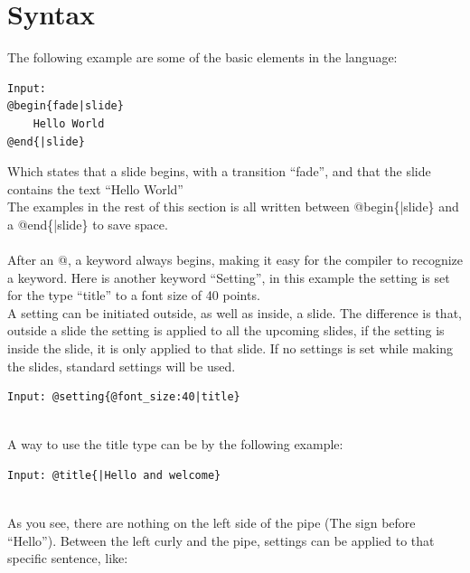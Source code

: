 \chapter{Syntax}
\label{SSyntax}
The following example are some of the basic elements in the language:
\begin{lstlisting}[frame=single]
Input:
@begin{fade|slide}
    Hello World
@end{|slide}
\end{lstlisting}


Which states that a slide begins, with a transition ``fade'', and that the slide contains the text ``Hello World'' \\
The examples in the rest of this section is all written between @begin\{|slide\} and a @end\{|slide\} to save space.
\\ \\
After an @, a keyword always begins, making it easy for the compiler to recognize a keyword.
Here is another keyword ``Setting'', in this example the setting is set for the type ``title'' to a font size of 40 points. \\
A setting can be initiated outside, as well as inside, a slide. The difference is that, outside a slide the setting is applied to all the upcoming slides, if the setting is inside the slide, it is only applied to that slide. If no settings is set while making the slides, standard settings will be used.

\begin{lstlisting}[frame=single]
Input: @setting{@font_size:40|title}
\end{lstlisting}

 \\

A way to use the title type can be by the following example:\\

\begin{lstlisting}[frame=single]
Input: @title{|Hello and welcome}
\end{lstlisting}

\\

As you see, there are nothing on the left side of the pipe (The sign before ``Hello''). Between the left curly and the pipe, settings can be applied to that specific sentence, like:\\

